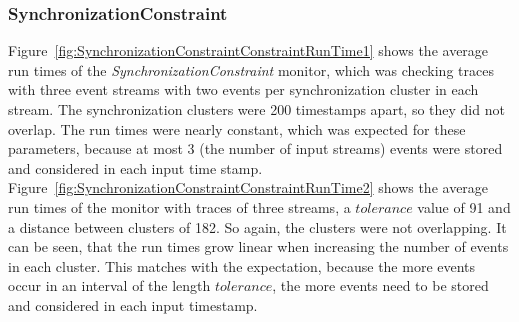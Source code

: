 \subsubsection{SynchronizationConstraint}
Figure~\ref{fig:SynchronizationConstraintConstraintRunTime1} shows the average run times of the \textit{SynchronizationConstraint} monitor, which was checking traces with three event streams with two events per synchronization cluster in each stream. The synchronization clusters were 200 timestamps apart, so they did not overlap. The run times were nearly constant, which was expected for these parameters, because at most 3 (the number of input streams) events were stored and considered in each input time stamp.\\
Figure~\ref{fig:SynchronizationConstraintConstraintRunTime2} shows the average run times of the monitor with traces of three streams, a $tolerance$ value of 91 and a distance between clusters of 182. So again, the clusters were not overlapping. It can be seen, that the run times grow linear when increasing the number of events in each cluster. This matches with the expectation, because the more events occur in an interval of the length $tolerance$, the more events need to be stored and considered in each input timestamp.
